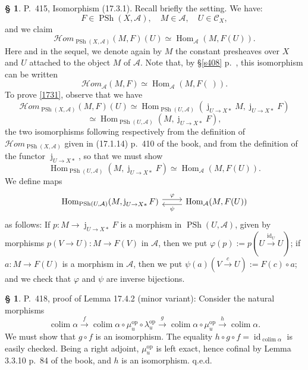 \documentclass[12pt]{article}%
\theoremstyle{remark}
\theoremstyle{definition}
\newtheorem{s}[thm]{\S}%
\newcommand{\cc}{\mathcal}
\newcommand{\oo}{\operatorname}
\newcommand{\A}{\mathcal A}
\newcommand{\C}{\mathcal C}
\newcommand{\pp}{\varphi}
\newcommand{\HOM}{\cc H\!\mathit{om}}
\newcommand{\xr}{\xrightarrow}
\DeclareMathOperator*{\colim}{colim}%
\DeclareMathOperator{\id}{id}
\DeclareMathOperator{\Hom}{Hom}%
\DeclareMathOperator{\op}{op}
\begin{document}
\begin{s}
P.~415, Isomorphism (17.3.1). Recall briefly the setting. We have: 
$$
F\in\oo{PSh}(X,\A),\quad M\in\A,\quad U\in\C_X,
$$ 
and we claim 
%
\begin{equation}\label{1731}
\HOM_{\oo{PSh}(X,\A)}(M,F)(U)\simeq\Hom_\A(M,F(U)).
\end{equation} 
%
Here and in the sequel, we denote again by $M$ the constant presheaves over $X$ and $U$ attached to the object $M$ of $\A$. Note that, by \S\ref{s408} p.~\pageref{s408}, this isomorphism can be written 
$$
\HOM_\A(M,F)\simeq\Hom_\A(M,F(\ )).
$$ 
To prove \eqref{1731}, observe that we have  
$$
\HOM_{\oo{PSh}(X,\A)}(M,F)(U)\simeq\Hom_{\oo{PSh}(U,\A)}(\oo j_{U\to X*}M,\oo j_{U\to X*}F)
$$ 
$$
\simeq\Hom_{\oo{PSh}(U,\A)}(M,\oo j_{U\to X*}F), 
$$ 
the two isomorphisms following respectively from the definition of $\HOM_{\oo{PSh}(X,\A)}$ given in (17.1.14) p.~410 of the book, and from the definition of the functor $\oo j_{U\to X*}$, so that we must show 
$$
\Hom_{\oo{PSh}(U,\A)}(M,\oo j_{U\to X*}F)\simeq\Hom_\A(M,F(U)).
$$
We define maps 
$$
\begin{tikzcd}
\Hom_{\oo{PSh}(U,\A)}(M,\oo j_{U\to X*}F)\ar[yshift=0.7ex]{r}{\pp}&\Hom_\A(M,F(U))\ar[yshift=-0.7ex]{l}{\psi}
\end{tikzcd} 
$$ 
as follows: If $p:M\to\oo j_{U\to X*}F$ is a morphism in $\oo{PSh}(U,\A)$, given by morphisms $p(V\to U):M\to F(V)$ in $\A$, then we put $\pp(p):=p(U\xr{\id_U}U)$; if $a:M\to F(U)$ is a morphism in $\A$, then we put $\psi(a)(V\xr cU):=F(c)\circ a$; and we check that $\pp$ and $\psi$ are inverse bijections. 
\end{s}


%

\begin{s} 
P.~418, proof of Lemma 17.4.2 (minor variant): Consider the natural morphisms 
$$
\colim\alpha\xr f\colim\alpha\circ\mu_u^{\op}\circ\lambda_u^{\op}\xr g\colim\alpha\circ\mu_u^{\op}\xr h\colim\alpha.
$$
We must show that $g\circ f$ is an isomorphism. The equality $h\circ g\circ f=\id_{\colim\alpha}$ is easily checked. Being a right adjoint, $\mu_u^{\op}$ is left exact, hence cofinal by Lemma 3.3.10 p.~84 of the book, and $h$ is an isomorphism. q.e.d.
\end{s}  

%
\end{document}
